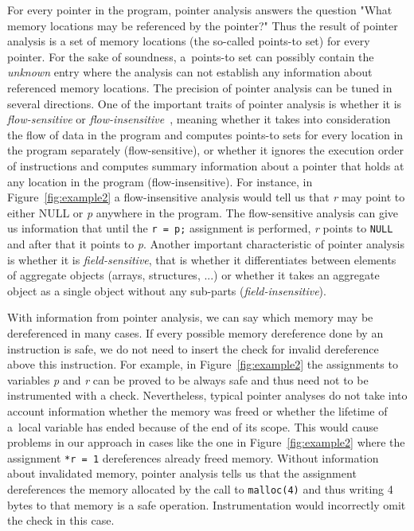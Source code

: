 For every pointer in the program, pointer analysis answers the
question "What memory locations may be referenced by the pointer?"
Thus the result of pointer analysis is a set of memory locations (the
so-called points-to set) for every pointer. For the sake of
soundness, a~points-to set can possibly contain the \emph{unknown}
entry where the analysis can not establish any information about
referenced memory locations. The precision of pointer analysis can be
tuned in several directions. One of the important traits of pointer
analysis is whether it is \emph{flow-sensitive} or
\emph{flow-insensitive}~\cite{Hind01}, meaning whether it takes into
consideration the flow of data in the program and computes points-to
sets for every location in the program separately (flow-sensitive), or
whether it ignores the execution order of instructions and computes
summary information about a pointer that holds at any location in the
program (flow-insensitive). For instance, in
Figure~\ref{fig:example2} a flow-insensitive analysis would tell us
that \emph{r} may point to either NULL or \emph{p} anywhere in the
program. The flow-sensitive analysis can give us information that
until the \texttt{r = p;} assignment is performed, \emph{r} points to
\texttt{NULL} and after that it points to \emph{p}. Another important
characteristic of pointer analysis is whether it is
\emph{field-sensitive}, that is whether it differentiates between
elements of aggregate objects (arrays, structures, ...) or whether it
takes an aggregate object as a single object without any sub-parts
(\emph{field-insensitive}).

With information from pointer analysis, we can say which memory may be
dereferenced in many cases. If every possible memory dereference done
by an instruction is safe, we do not need to insert the check for
invalid dereference above this instruction. For example, in
Figure~\ref{fig:example2} the assignments to variables \emph{p} and
\emph{r} can be proved to be always safe and thus need not to be
instrumented with a check. Nevertheless, typical pointer analyses do
not take into account information whether the memory was freed or
whether the lifetime of a~local variable has ended because of the end
of its scope.  This would cause problems in our approach in cases like
the one in Figure~\ref{fig:example2} where the assignment \texttt{*r =
  1} dereferences already freed memory.  Without information about
invalidated memory, pointer analysis tells us that the assignment
dereferences the memory allocated by the call to \texttt{malloc(4)}
and thus writing 4 bytes to that memory is a safe operation.
Instrumentation would incorrectly omit the check in this case.

